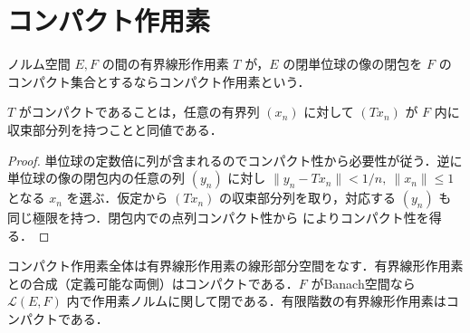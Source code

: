 \section{コンパクト作用素}
\begin{defn}[コンパクト作用素]
ノルム空間 $E,F$ の間の有界線形作用素 $T$ が，$E$ の閉単位球の像の閉包を $F$ のコンパクト集合とするならコンパクト作用素という．
\end{defn}
\begin{prop}[コンパクト作用素の点列判定]
$T$ がコンパクトであることは，任意の有界列 $(x_n)$ に対して $(Tx_n)$ が $F$ 内に収束部分列を持つことと同値である．
\end{prop}
\begin{proof}
単位球の定数倍に列が含まれるのでコンパクト性から必要性が従う．逆に単位球の像の閉包内の任意の列 $(y_n)$ に対し $\|y_n-Tx_n\|<1/n,\ \|x_n\|\leq1$ となる $x_n$ を選ぶ．仮定から $(Tx_n)$ の収束部分列を取り，対応する $(y_n)$ も同じ極限を持つ．閉包内での点列コンパクト性から  によりコンパクト性を得る．
\end{proof}
\begin{prop}[コンパクト作用素の線形性・合成・閉性]
コンパクト作用素全体は有界線形作用素の線形部分空間をなす．有界線形作用素との合成（定義可能な両側）はコンパクトである．$F$ がBanach空間なら $\mathcal L(E,F)$ 内で作用素ノルムに関して閉である．有限階数の有界線形作用素はコンパクトである．
\end{prop}
